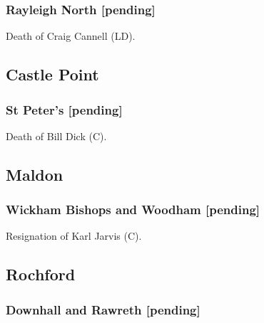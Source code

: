 \documentclass[a4paper,openany]{book}
\begin{document}
\begin{resultsiii}
\subsubsection*{Rayleigh North \hspace*{\fill}\nolinebreak[1]%
	\enspace\hspace*{\fill}
	[pending]}


Death of Craig Cannell (LD).

\subsection*{Castle Point}

\subsubsection*{St Peter's \hspace*{\fill}\nolinebreak[1]%
	\enspace\hspace*{\fill}
	[pending]}


Death of Bill Dick (C).

\subsection*{Maldon}

\subsubsection*{Wickham Bishops and Woodham \hspace*{\fill}\nolinebreak[1]%
	\enspace\hspace*{\fill}
	[pending]}


Resignation of Karl Jarvis (C).

\subsection*{Rochford}

\subsubsection*{Downhall and Rawreth \hspace*{\fill}\nolinebreak[1]%
	\enspace\hspace*{\fill}
	[pending]}


\end{resultsiii}
\end{document}
